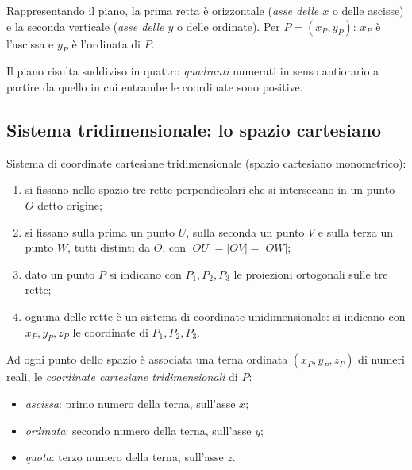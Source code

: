 \documentclass[11pt,a4paper]{article}
\begin{document}
Rappresentando il piano, la prima retta è orizzontale (\emph{asse delle $x$} o delle ascisse) e la seconda verticale (\emph{asse delle $y$} o delle ordinate). Per $P = (x_P, y_P)$: $x_P$ è l'ascissa e $y_P$ è l'ordinata di $P$.

Il piano risulta suddiviso in quattro \emph{quadranti} numerati in senso antiorario a partire da quello in cui entrambe le coordinate sono positive.

\begin{center}
\end{center}

\subsection{Sistema tridimensionale: lo spazio cartesiano}

Sistema di coordinate cartesiane tridimensionale (spazio cartesiano monometrico):
\begin{enumerate}
    \item si fissano nello spazio tre rette perpendicolari che si intersecano in un punto $O$ detto origine;
    \item si fissano sulla prima un punto $U$, sulla seconda un punto $V$ e sulla terza un punto $W$, tutti distinti da $O$, con $|OU| = |OV| = |OW|$;
    \item dato un punto $P$ si indicano con $P_1, P_2, P_3$ le proiezioni ortogonali sulle tre rette;
    \item ognuna delle rette è un sistema di coordinate unidimensionale: si indicano con $x_P, y_P, z_P$ le coordinate di $P_1, P_2, P_3$.
\end{enumerate}
Ad ogni punto dello spazio è associata una terna ordinata $(x_P, y_P, z_P)$ di numeri reali, le \emph{coordinate cartesiane tridimensionali} di $P$:
\begin{itemize}
    \item \emph{ascissa}: primo numero della terna, sull'asse $x$;
    \item \emph{ordinata}: secondo numero della terna, sull'asse $y$;
    \item \emph{quota}: terzo numero della terna, sull'asse $z$.
\end{itemize}
\end{document}
